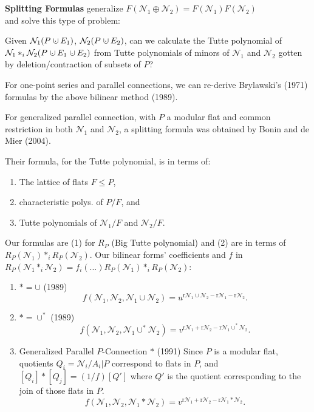 \documentclass[%
  slidesonly,%
  semlayer,%
  amsmath
  ]{seminar}                                  %
\newcommand{\dunion}
{\mbox{\hbox{\hskip0.45em$\cdot$\hskip-0.44em$\cup$\hskip0.2em}}}
\newcommand{\Rank}{{\mbox{r}}}%
\begin{document}
\begin{slide}
\textbf{Splitting Formulas} 
generalize $F(\mathcal{N}_1\oplus\mathcal{N}_2)=F(\mathcal{N}_1)F(\mathcal{N}_2)$\\
and solve this type of problem:

Given $\mathcal{N}_1(P\dunion E_1)$, $\mathcal{N}_2(P\dunion E_2)$, can we calculate 
the Tutte polynomial of 
$\mathcal{N}_1*_i\mathcal{N}_2(P\dunion{E_1}\dunion{E_2})$ from
Tutte polynomials of minors of 
$\mathcal{N}_1$ and $\mathcal{N}_2$ gotten by deletion/contraction of subsets of
$P$?

For one-point series and parallel connections, we can re-derive Brylawski's
(1971) formulas by the above bilinear method (1989).

For generalized parallel connection, with $P$ a modular flat and common restriction
in both $\mathcal{N}_1$ and $\mathcal{N}_2$, a splitting formula was obtained
by Bonin and de Mier (2004).  

Their formula, for the Tutte polynomial, 
is in terms of:
\begin{enumerate}
\item The lattice of flats $F\le P$, 
\item characteristic polys. of $P/F$, and 
\item Tutte polynomials of $\mathcal{N}_1/F$ and 
$\mathcal{N}_2/F$.
\end{enumerate}
\end{slide}

\begin{slide}
Our formulas are (1) for $R_P$ (Big Tutte polynomial)
and (2) are in terms of $R_P(\mathcal{N}_1)*_iR_P(\mathcal{N}_2)$.
Our bilinear forms' coefficients and $f$ in 
$R_P(\mathcal{N}_1*_i\mathcal{N}_2)=f_i(...)R_P(\mathcal{N}_1)*_iR_P(\mathcal{N}_2)$:
\begin{enumerate}
\item $*=\cup$ (1989)
\[
f(\mathcal{N}_1,\mathcal{N}_2,\mathcal{N}_1\cup\mathcal{N}_2) = 
u^{\Rank\mathcal{N}_1\cup\mathcal{N}_2-\Rank\mathcal{N}_1-\Rank\mathcal{N}_2}.
\]
\item $*=\cup^*$ (1989)
\[
f(\mathcal{N}_1,\mathcal{N}_2,\mathcal{N}_1\cup^*\mathcal{N}_2) = 
v^{\Rank\mathcal{N}_1+\Rank\mathcal{N}_2-\Rank\mathcal{N}_1\cup^*\mathcal{N}_2}.
\]
\item Generalized Parallel $P$-Connection $*$ (1991)
Since $P$ is a modular flat, quotients 
$Q_i=\mathcal{N}_i/A_i|P$ correspond to flats in $P$,
and $[Q_i]*[Q_j]=(1/f)[Q']$ where $Q'$ is the quotient
corresponding to the join of those flats in $P$.
\[
f(\mathcal{N}_1,\mathcal{N}_2,\mathcal{N}_1*\mathcal{N}_2) = 
v^{\Rank\mathcal{N}_1+\Rank\mathcal{N}_2-\Rank\mathcal{N}_1*\mathcal{N}_2}.
\]
\end{enumerate}
\end{slide}
\end{document}
